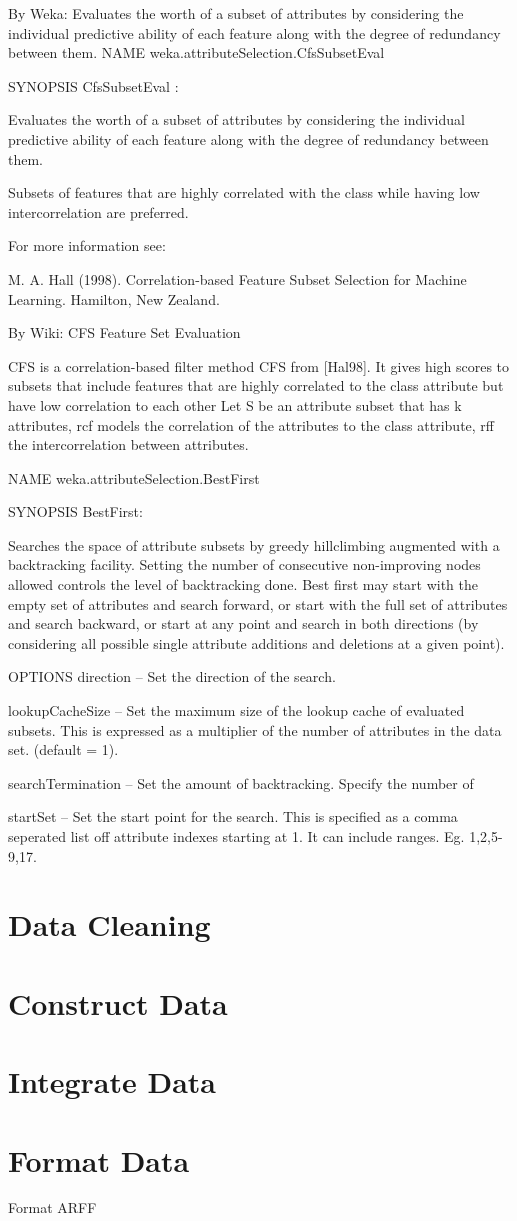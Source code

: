 By Weka:
Evaluates the worth of a subset of attributes by considering the individual predictive ability of each feature along with the degree of redundancy between them.
NAME
weka.attributeSelection.CfsSubsetEval

SYNOPSIS
CfsSubsetEval :

Evaluates the worth of a subset of attributes by considering the individual predictive ability of each feature along with the degree of redundancy between them.

Subsets of features that are highly correlated with the class while having low intercorrelation are preferred.

For more information see:

M. A. Hall (1998). Correlation-based Feature Subset Selection for Machine Learning. Hamilton, New Zealand.



By Wiki:
CFS Feature Set Evaluation

CFS is a correlation-based filter method CFS from [Hal98]. It gives high scores to subsets that include features
that are highly correlated to the class attribute but have low correlation to each other Let S be an attribute
subset that has k attributes, rcf models the correlation of the attributes to the class attribute, rff the
intercorrelation between attributes.


NAME
weka.attributeSelection.BestFirst

SYNOPSIS
BestFirst:

Searches the space of attribute subsets by greedy hillclimbing augmented with a backtracking facility. Setting the number of consecutive non-improving nodes allowed controls the level of backtracking done. Best first may start with the empty set of attributes and search forward, or start with the full set of attributes and search backward, or start at any point and search in both directions (by considering all possible single attribute additions and deletions at a given point).


OPTIONS
direction -- Set the direction of the search.

lookupCacheSize -- Set the maximum size of the lookup cache of evaluated subsets. This is expressed as a multiplier of the number of attributes in the data set. (default = 1).

searchTermination -- Set the amount of backtracking. Specify the number of 

startSet -- Set the start point for the search. This is specified as a comma seperated list off attribute indexes starting at 1. It can include ranges. Eg. 1,2,5-9,17.

\section{Data Cleaning}

\section{Construct Data}

\section{Integrate Data}

\section{Format Data}
Format ARFF
